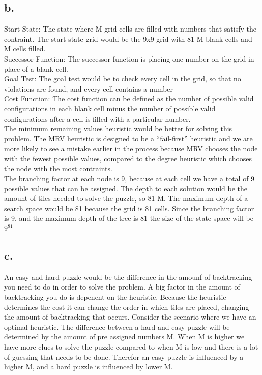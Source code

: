 \documentclass[11pt]{article} %
\begin{document}
\subsection*{b.}


Start State: The state where M grid cells are filled with numbers that satisfy the contraint. The start state grid would be the 9x9 grid with 81-M blank cells and M cells filled.\\

Successor Function: The successor function is placing one number on the grid in place of a blank cell.\\

Goal Test: The goal test would be to check every cell in the grid, so that no violations are found, and every cell contains a number\\
Cost Function: The cost function can be defined as the number of possible valid configurations in each blank cell minus the number of possible valid configurations after a cell is filled with a particular number.\\

The minimum remaining values heuristic would be better for solving this problem. The MRV heuristic is designed to be a ``fail-first'' heuristic and we are more likely to see a mistake earlier in the process because MRV chooses the node with the fewest possible values, compared to the degree heuristic which chooses the node with the most contraints.\\

The branching factor at each node is 9, because at each cell we have a total of 9 possible values that can be assigned. The depth to each solution would be the amount of tiles needed to solve the puzzle, so 81-M. The maximum depth of a search space would be 81 because the grid is 81 cells. Since the branching factor is 9, and the maximum depth of the tree is 81 the size of the state space will be $9^{81}$
\subsection*{c.}
An easy and hard puzzle would be the difference in the amounf of backtracking you need to do in order to solve the problem. A big factor in the amount of backtracking you do is depenent on the heuristic. Because the heuristic determines the cost it can change the order in which tiles are placed, changing the amount of backtracking that occurs. Consider the scenario where we have an optimal heuristic. The difference between a hard and easy puzzle will be determined by the amount of pre assigned numbers M. When M is higher we have more clues to solve the puzzle compared to when M is low and there is a lot of guessing that needs to be done. Therefor an easy puzzle is influenced by a higher M, and a hard puzzle is influenced by lower M.
\end{document}
